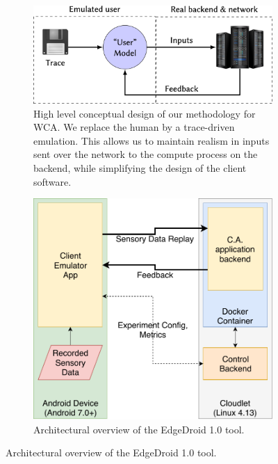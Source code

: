 \begin{figure}
    \centering
    \begin{subfigure}[b]{.45\textwidth}
        \centering
        \includegraphics[width=\textwidth]{Figs/trace_edgedroid}
        \caption{%
            High level conceptual design of our methodology for \gls{WCA}.
            We replace the human by a trace-driven emulation.
            This allows us to maintain realism in inputs sent over the network to the compute process on the backend, while simplifying the design of the client software.
        }\label{fig:methodology:wca:conceptual}
    \end{subfigure}
    \hfill
    \begin{subfigure}[b]{.45\textwidth}
        \centering
        \includegraphics[width=\textwidth]{publications/2018DemoScalingOnTheEdge/img/TraceReplay_GenArch}
        \caption{%
            Architectural overview of the EdgeDroid \num{1.0} tool.
}
\end{subfigure}
\end{figure}
